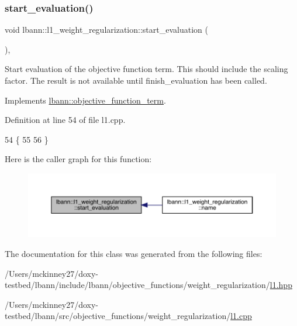 \subsubsection{\texorpdfstring{start\+\_\+evaluation()}{start\_evaluation()}}
{\footnotesize\ttfamily void lbann\+::l1\+\_\+weight\+\_\+regularization\+::start\+\_\+evaluation (\begin{DoxyParamCaption}{ }\end{DoxyParamCaption})\hspace{0.3cm}{\ttfamily [override]}, {\ttfamily [virtual]}}

Start evaluation of the objective function term. This should include the scaling factor. The result is not available until finish\+\_\+evaluation has been called. 

Implements \hyperlink{classlbann_1_1objective__function__term_a0af4dfd71fb30e43d1ae7611172ad9b0}{lbann\+::objective\+\_\+function\+\_\+term}.



Definition at line 54 of file l1.\+cpp.


\begin{DoxyCode}
54                                                 \{
55 
56 \}
\end{DoxyCode}
Here is the caller graph for this function\+:\nopagebreak
\begin{figure}[H]
\begin{center}
\leavevmode
\includegraphics[width=350pt]{classlbann_1_1l1__weight__regularization_ace2c0fe490dd1e630460063b6df23597_icgraph}
\end{center}
\end{figure}


The documentation for this class was generated from the following files\+:\begin{DoxyCompactItemize}
\item 
/\+Users/mckinney27/doxy-\/testbed/lbann/include/lbann/objective\+\_\+functions/weight\+\_\+regularization/\hyperlink{l1_8hpp}{l1.\+hpp}\item 
/\+Users/mckinney27/doxy-\/testbed/lbann/src/objective\+\_\+functions/weight\+\_\+regularization/\hyperlink{l1_8cpp}{l1.\+cpp}\end{DoxyCompactItemize}
